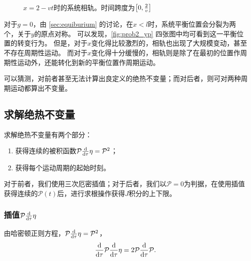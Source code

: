\documentclass[a4paper,unicode]{report}
\begin{document}
\begin{figure}
    \centering
    \\
    \caption{$x=2-vt$时的系统相轨。时间跨度为$\qty[0, \frac{2}{v}]$}
    \label{fig:prob2_yp}
\end{figure}

对于$g=0$，由 \autoref{sec:equiburium} 的讨论，在$x<l$时，系统平衡位置会分裂为两个，关于$y$的原点对称。
可以发现，\autoref{fig:prob2_yp} 四张图中均可看到这一平衡位置的转变行为。
但是，对于$x$变化得比较激烈的，相轨也出现了大规模变动，甚至不存在周期性运动。
而对于$x$变化得十分缓慢的，相轨则是除了在最初的位置作周期性运动外，还能转化到新的平衡位置作周期运动。

可以猜测，对前者甚至无法计算出良定义的绝热不变量；而对后者，则可对两种周期运动都算出不变量。

\subsection{求解绝热不变量}
求解绝热不变量有两个部分：
\begin{enumerate}
    \item 获得连续的被积函数$\mathcal{P}\dv{\tau}\eta=\mathcal{P}^2$；
    \item 获得每个运动周期的起始时刻。
\end{enumerate}
对于前者，我们使用三次厄密插值；对于后者，我们以$\mathcal{P}=0$为判据，在使用插值获得连续的$\mathcal{P}(t)$后，进行求根操作获得$J$积分的上下限。

\subsubsection{插值\texorpdfstring{$\mathcal{P}\dv{\tau}\eta$}{P d/dτ η}}
由哈密顿正则方程，$\mathcal{P}\dv{\tau}\eta = \mathcal{P}^2$，
\begin{equation}
    \dv{\tau}\mathcal{P}\dv{\tau}\eta = 2\mathcal{P}\dv{\tau}\mathcal{P}.
\end{equation}
\end{document}
